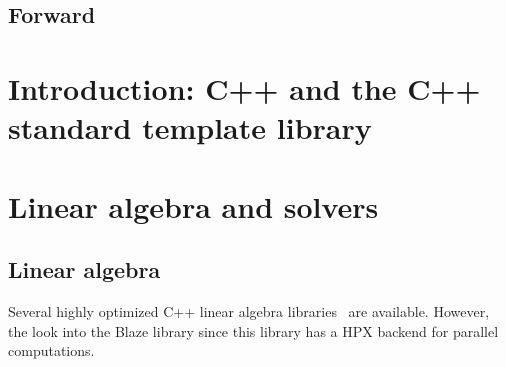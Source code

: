 \documentclass[11pt,fleqn]{book} %
\begin{document}
\tableofcontents %

\cleardoublepage %

\pagestyle{fancy} %

\chapter*{Forward}


\part{Introduction: C++ and the C++ standard template library}




\part{Linear algebra and solvers}

\chapter{Linear algebra}





Several highly optimized C++ linear algebra libraries~\cite{wang2013augem,eigenweb,rupp2016viennacl,sanderson2016armadillo} are available. However, the look into the Blaze library since this library has a HPX backend for parallel computations. 


\end{document}
